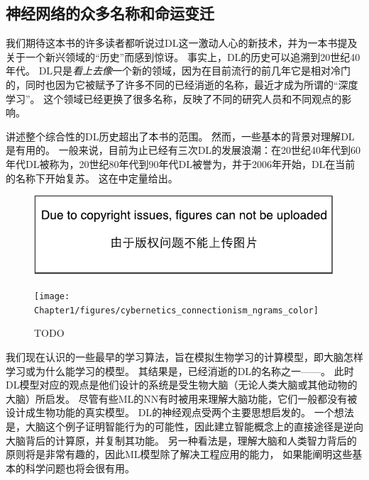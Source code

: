 \subsection{神经网络的众多名称和命运变迁}
\label{sec:the_many_names_and_changing_fortunes_of_neural_networks}

我们期待这本书的许多读者都听说过\gls{DL}这一激动人心的新技术，并为一本书提及关于一个新兴领域的``历史''而感到惊讶。
事实上，\gls{DL}的历史可以追溯到20世纪40年代。
\gls{DL}只是\emph{看上去像}一个新的领域，因为在目前流行的前几年它是相对冷门的，同时也因为它被赋予了许多不同的已经消逝的名称，最近才成为所谓的``深度学习''。
这个领域已经更换了很多名称，反映了不同的研究人员和不同观点的影响。

讲述整个综合性的\gls{DL}历史超出了本书的范围。
然而，一些基本的背景对理解\gls{DL}是有用的。
一般来说，目前为止已经有三次\gls{DL}的发展浪潮：在20世纪40年代到60年代\gls{DL}被称为，20世纪80年代到90年代\gls{DL}被誉为，并于2006年开始，\gls{DL}在当前的名称下开始复苏。
这在中定量给出。
\begin{figure}[!htb]
\ifOpenSource
\centerline{\includegraphics{figure.pdf}}
\else
\centerline{\texttt{[image: Chapter1/figures/cybernetics\_connectionism\_ngrams\_color]}}
\fi
\caption{TODO}
\label{fig:chap1_cybernetics_connectionism_ngrams_color}
\end{figure}


我们现在认识的一些最早的学习算法，旨在模拟生物学习的计算模型，即大脑怎样学习或为什么能学习的模型。
其结果是，已经消逝的\gls{DL}的名称之一——。
此时\gls{DL}模型对应的观点是他们设计的系统是受生物大脑（无论人类大脑或其他动物的大脑）所启发。
尽管有些\gls{ML}的\gls{NN}有时被用来理解大脑功能\citep{hinton1991lesioning}，它们一般都没有被设计成生物功能的真实模型。
\gls{DL}的神经观点受两个主要思想启发的。
一个想法是，大脑这个例子证明智能行为的可能性，因此建立智能概念上的直接途径是逆向大脑背后的计算原，并复制其功能。
另一种看法是，理解大脑和人类智力背后的原则将是非常有趣的，因此\gls{ML}模型除了解决工程应用的能力， 如果能阐明这些基本的科学问题也将会很有用。 

